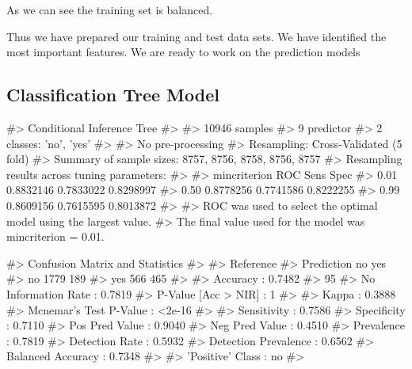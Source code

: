 As we can see the training set is balanced.

Thus we have prepared our training and test data sets. We have
identified the most important features. We are ready to work on the
prediction models

\hypertarget{classification-tree-model}{%
\subsection{Classification Tree Model}\label{classification-tree-model}}

\begin{Schunk}
\begin{Soutput}
#> Conditional Inference Tree 
#> 
#> 10946 samples
#>     9 predictor
#>     2 classes: 'no', 'yes' 
#> 
#> No pre-processing
#> Resampling: Cross-Validated (5 fold) 
#> Summary of sample sizes: 8757, 8756, 8758, 8756, 8757 
#> Resampling results across tuning parameters:
#> 
#>   mincriterion  ROC        Sens       Spec     
#>   0.01          0.8832146  0.7833022  0.8298997
#>   0.50          0.8778256  0.7741586  0.8222255
#>   0.99          0.8609156  0.7615595  0.8013872
#> 
#> ROC was used to select the optimal model using the largest value.
#> The final value used for the model was mincriterion = 0.01.
\end{Soutput}
\end{Schunk}

\begin{Schunk}
\begin{Soutput}
#> Confusion Matrix and Statistics
#> 
#>           Reference
#> Prediction   no  yes
#>        no  1779  189
#>        yes  566  465
#>                                           
#>                Accuracy : 0.7482          
#>                  95%
#>     No Information Rate : 0.7819          
#>     P-Value [Acc > NIR] : 1               
#>                                           
#>                   Kappa : 0.3888          
#>  Mcnemar's Test P-Value : <2e-16          
#>                                           
#>             Sensitivity : 0.7586          
#>             Specificity : 0.7110          
#>          Pos Pred Value : 0.9040          
#>          Neg Pred Value : 0.4510          
#>              Prevalence : 0.7819          
#>          Detection Rate : 0.5932          
#>    Detection Prevalence : 0.6562          
#>       Balanced Accuracy : 0.7348          
#>                                           
#>        'Positive' Class : no              
#> 
\end{Soutput}
\end{Schunk}

